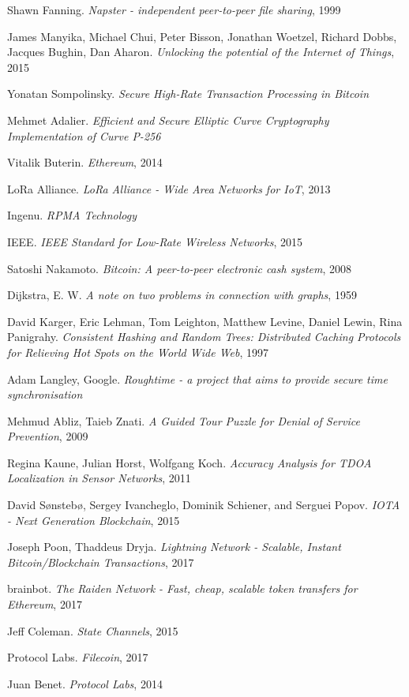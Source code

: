 \documentclass[10pt, nonatbib, nocopyrightspace, reprint]{sigplanconf}
\begin{document}
\begin{thebibliography}{10}
\softraggedright

    Shawn Fanning. 
    \emph{Napster - independent peer-to-peer file sharing}, 1999

    James Manyika, Michael Chui, Peter Bisson, Jonathan Woetzel, Richard Dobbs, Jacques Bughin, Dan Aharon. 
    \emph{Unlocking the potential of the Internet of Things}, 2015

    Yonatan Sompolinsky. 
    \emph{Secure High-Rate Transaction Processing in Bitcoin}

    Mehmet Adalier. 
    \emph{Efficient and Secure Elliptic Curve Cryptography Implementation of Curve P-256}

    Vitalik Buterin. 
    \emph{Ethereum}, 2014

    LoRa Alliance. 
    \emph{LoRa Alliance - Wide Area Networks for IoT}, 2013

    Ingenu. 
    \emph{RPMA Technology}

    IEEE. 
    \emph{IEEE Standard for Low-Rate Wireless Networks}, 2015

    Satoshi Nakamoto. 
    \emph{Bitcoin: A peer-to-peer electronic cash system}, 2008

    Dijkstra, E. W. 
    \emph{A note on two problems in connection with graphs}, 1959

    David Karger, Eric Lehman, Tom Leighton, Matthew Levine, Daniel Lewin, Rina Panigrahy. 
    \emph{Consistent Hashing and Random Trees: Distributed Caching Protocols for Relieving Hot Spots on the World Wide Web}, 1997

    Adam Langley, Google. 
    \emph{Roughtime - a project that aims to provide secure time synchronisation}

    Mehmud Abliz, Taieb Znati. 
    \emph{A Guided Tour Puzzle for Denial of Service Prevention}, 2009

    Regina Kaune, Julian Horst, Wolfgang Koch. 
    \emph{Accuracy Analysis for TDOA Localization in Sensor Networks}, 2011

    David Sønstebø, Sergey Ivancheglo, Dominik Schiener, and Serguei Popov. 
    \emph{IOTA - Next Generation Blockchain}, 2015

    Joseph Poon, Thaddeus Dryja. 
    \emph{Lightning Network - Scalable, Instant Bitcoin/Blockchain Transactions}, 2017

    brainbot. 
    \emph{The Raiden Network - Fast, cheap, scalable token transfers for Ethereum}, 2017

    Jeff Coleman. 
    \emph{State Channels}, 2015

    Protocol Labs. 
    \emph{Filecoin}, 2017

    Juan Benet. 
    \emph{Protocol Labs}, 2014

\end{thebibliography}
\end{document}
